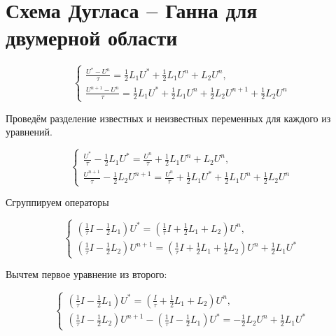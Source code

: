 \documentclass[a4paper,12pt]{article}
\begin{document}
\section{Схема Дугласа -- Ганна для двумерной области}
\begin{equation}
  \begin{cases}
    \frac{U^* - U^n}{\tau} = \frac{1}{2} L_1 U^* + \frac{1}{2} L_1 U^n + L_2 U^n, \\
    \frac{U^{n+1} - U^n}{\tau} = \frac{1}{2} L_1 U^* + \frac{1}{2} L_1 U^n + \frac{1}{2} L_2 U^{n+1} + \frac{1}{2} L_2 U^n
  \end{cases}
\end{equation}

Проведём разделение известных и неизвестных переменных для каждого из уравнений.

\begin{equation}
  \begin{cases}
    \frac{U^*}{\tau} - \frac{1}{2} L_1 U^* = \frac{U^n}{\tau} + \frac{1}{2} L_1 U^n + L_2 U^n, \\
    \frac{U^{n+1}}{\tau} - \frac{1}{2} L_2 U^{n+1} = \frac{U^n}{\tau} + \frac{1}{2} L_1 U^* + \frac{1}{2} L_1 U^n + \frac{1}{2} L_2 U^n
  \end{cases}
\end{equation}


Сгруппируем операторы

\begin{equation}
  \begin{cases}
    \left( \frac{1}{\tau} I - \frac{1}{2} L_1 \right) U^* = \left( \frac{1}{\tau} I + \frac{1}{2} L_1 + L_2 \right) U^n, \\
    \left( \frac{1}{\tau} I - \frac{1}{2} L_2 \right) U^{n+1} = \left( \frac{1}{\tau} I  + \frac{1}{2} L_1 + \frac{1}{2} L_2 \right) U^n + \frac{1}{2} L_1 U^*
  \end{cases}
\end{equation}

Вычтем первое уравнение из второго:

\begin{equation}
  \begin{cases}
    \left( \frac{1}{\tau} I - \frac{1}{2} L_1 \right) U^* = \left( \frac{I}{\tau} + \frac{1}{2} L_1 + L_2 \right) U^n, \\
    \left( \frac{1}{\tau} I - \frac{1}{2} L_2 \right) U^{n+1} - \left( \frac{1}{\tau} I - \frac{1}{2} L_1 \right) U^* = - \frac{1}{2} L_2 U^n + \frac{1}{2} L_1 U^*
  \end{cases}
\end{equation}
\end{document}
